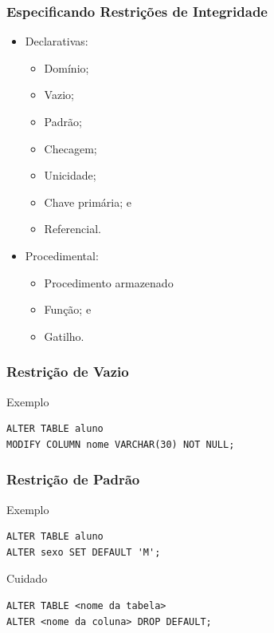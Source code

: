 \documentclass{beamer}
\begin{document}
\begin{frame}
\frametitle{Especificando Restrições de Integridade}

\begin{itemize}
	\item Declarativas:
	\begin{itemize}
		\item Domínio;
		\item Vazio;
		\item Padrão;
		\item Checagem;
		\item Unicidade;
		\item Chave primária; e
		\item Referencial.
	\end{itemize}
	\item Procedimental:
	\begin{itemize}
	\item Procedimento armazenado
	\item Função; e
	\item Gatilho.
	\end{itemize}
\end{itemize}
\end{frame}

\begin{frame}[fragile]
\frametitle{Restrição de Vazio}

\begin{exampleblock}{Exemplo}
\begin{lstlisting}
ALTER TABLE aluno
MODIFY COLUMN nome VARCHAR(30) NOT NULL;
\end{lstlisting}
\end{exampleblock}
\end{frame}

\begin{frame}[fragile]
\frametitle{Restrição de Padrão}

\begin{exampleblock}{Exemplo}
\begin{lstlisting}
ALTER TABLE aluno
ALTER sexo SET DEFAULT 'M';
\end{lstlisting}
\end{exampleblock}\vfill

\begin{alertblock}{Cuidado}
	\begin{lstlisting}
ALTER TABLE <nome da tabela>
ALTER <nome da coluna> DROP DEFAULT;
	\end{lstlisting}
\end{alertblock}
\end{frame}
\end{document}
